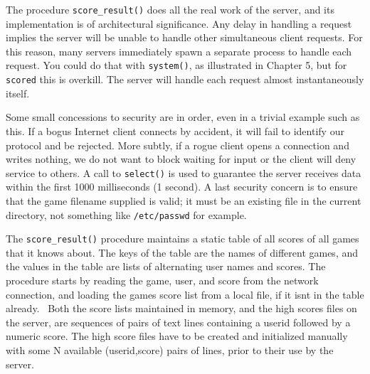 The procedure \texttt{score\_result()} does all the real work of the
server, and its implementation is of architectural significance. Any
delay in handling a request implies the server will be unable to
handle other simultaneous client requests. For this reason, many servers
immediately spawn a separate process to handle each request.
You could do that with \texttt{system()}, as illustrated in Chapter 5,
but for \texttt{scored} this is overkill. The server will handle each
request almost instantaneously itself.

Some small concessions to security are in order, even in a trivial
example such as this. If a bogus Internet client connects by accident,
it will fail to identify our protocol and be rejected. More subtly, if
a rogue client opens a connection and writes nothing, we do not want to
block waiting for input or the client will deny service to others. A
call to \texttt{select()} is used to guarantee the server receives data within
the first 1000 milliseconds (1 second). A last security concern is to
ensure that the {\textquotedbl}game{\textquotedbl} filename supplied is
valid; it must be an existing file in the current directory, not
something like \texttt{/etc/passwd} for example. 

The \texttt{score\_result()} procedure maintains a static table of all
scores of all games that it knows about. The keys of the table are the
names of different games, and the values in the table are lists of
alternating user names and scores. The procedure starts by reading the
game, user, and score from the network connection, and loading the
game{\textquotesingle}s score list from a local file, if it
isn{\textquotesingle}t in the table already. \ Both the score lists
maintained in memory, and the high scores files on the server, are
sequences of pairs of text lines containing a userid followed by a
numeric score. The high score files have to be created and initialized
manually with some N available (userid,score) pairs of lines, prior to
their use by the server.

